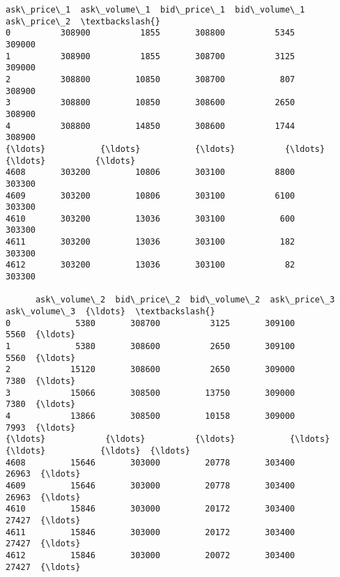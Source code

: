 \documentclass[9pt]{article}
\begin{document}
\begin{scriptsize}
            \begin{tcolorbox}[breakable, size=fbox, boxrule=.5pt, pad at break*=1mm, opacityfill=0]
\begin{Verbatim}[commandchars=\\\{\}]
      ask\_price\_1  ask\_volume\_1  bid\_price\_1  bid\_volume\_1  ask\_price\_2  \textbackslash{}
0          308900          1855       308800          5345       309000
1          308900          1855       308700          3125       309000
2          308800         10850       308700           807       308900
3          308800         10850       308600          2650       308900
4          308800         14850       308600          1744       308900
{\ldots}           {\ldots}           {\ldots}          {\ldots}           {\ldots}          {\ldots}
4608       303200         10806       303100          8800       303300
4609       303200         10806       303100          6100       303300
4610       303200         13036       303100           600       303300
4611       303200         13036       303100           182       303300
4612       303200         13036       303100            82       303300

      ask\_volume\_2  bid\_price\_2  bid\_volume\_2  ask\_price\_3  ask\_volume\_3  {\ldots}  \textbackslash{}
0             5380       308700          3125       309100          5560  {\ldots}
1             5380       308600          2650       309100          5560  {\ldots}
2            15120       308600          2650       309000          7380  {\ldots}
3            15066       308500         13750       309000          7380  {\ldots}
4            13866       308500         10158       309000          7993  {\ldots}
{\ldots}            {\ldots}          {\ldots}           {\ldots}          {\ldots}           {\ldots}  {\ldots}
4608         15646       303000         20778       303400         26963  {\ldots}
4609         15646       303000         20778       303400         26963  {\ldots}
4610         15846       303000         20172       303400         27427  {\ldots}
4611         15846       303000         20172       303400         27427  {\ldots}
4612         15846       303000         20072       303400         27427  {\ldots}


\end{Verbatim}
\end{tcolorbox}
\end{scriptsize}
\end{document}
